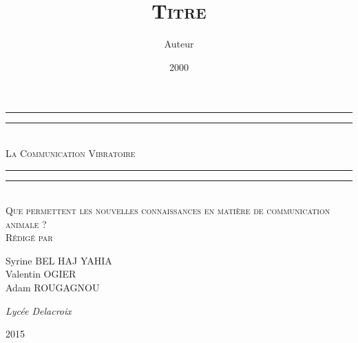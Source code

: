 \documentclass[11pt,a4paper,oneside,french]{article}
\title{\textsc{Titre}}
\author{Auteur}
\date{2000}
\begin{document}
	\begin{titlepage}
		\centering
		\vspace*{\baselineskip}
		\rule{\textwidth}{1.6pt}\vspace*{-\baselineskip}\vspace*{2pt}
		\rule{\textwidth}{0.4pt}\\[\baselineskip]
		{\LARGE\scshape La Communication Vibratoire}\\[0.2\baselineskip]
		\rule{\textwidth}{0.4pt}\vspace*{-\baselineskip}\vspace{3.2pt}
		\rule{\textwidth}{1.6pt}\\[\baselineskip]
		\scshape
		Que permettent les nouvelles connaissances en matière de communication animale ?\\
		\vspace*{2\baselineskip}
		Rédigé par \\[\baselineskip]
		{\Large Syrine BEL HAJ YAHIA \\ Valentin OGIER \\ Adam ROUGAGNOU\par}
		{\itshape Lycée Delacroix\par}
		\vfill
		{\scshape 2015} \\
		{\large}\par
	\end{titlepage}
	
	\thispagestyle{empty}
	\addtocounter{page}{-1}%
	\mbox{}
	
	\tableofcontents
	
	
	
	
	
	
	
	
	
	
	
	
\end{document}
